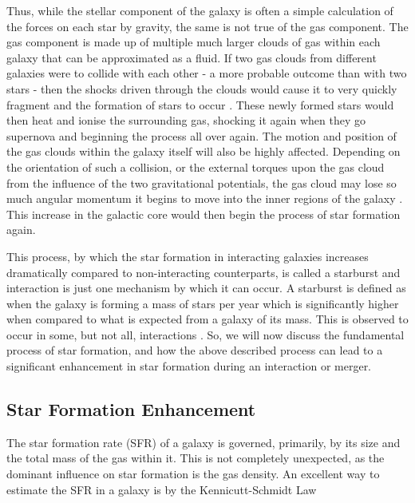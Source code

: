 Thus, while the stellar component of the galaxy is often a simple calculation of the forces on each star by gravity, the same is not true of the gas component. The gas component is made up of multiple much larger clouds of gas within each galaxy that can be approximated as a fluid. If two gas clouds from different galaxies were to collide with each other - a more probable outcome than with two stars - then the shocks driven through the clouds would cause it to very quickly fragment and the formation of stars to occur \citep{Papers on fragmentation of gas in interaction, paper on star formation in star fragments}. These newly formed stars would then heat and ionise the surrounding gas, shocking it again when they go supernova and beginning the process all over again. The motion and position of the gas clouds within the galaxy itself will also be highly affected. Depending on the orientation of such a collision, or the external torques upon the gas cloud from the influence of the two gravitational potentials, the gas cloud may lose so much angular momentum it begins to move into the inner regions of the galaxy \citep{Need a paper which talks about torques on gas in a system and the feedback involved here.}. This increase in the galactic core would then begin the process of star formation again. 

This process, by which the star formation in interacting galaxies increases dramatically compared to non-interacting counterparts, is called a starburst and interaction is just one mechanism by which it can occur. A starburst is defined as when the galaxy is forming a mass of stars per year which is significantly higher when compared to what is expected from a galaxy of its mass. This is observed to occur in some, but not all, interactions \citep{Review paper on starbursts in galaxies}. So, we will now discuss the fundamental process of star formation, and how the above described process can lead to a significant enhancement in star formation during an interaction or merger.


\subsection{Star Formation Enhancement} 
\noindent The star formation rate (SFR) of a galaxy is governed, primarily, by its size and the total mass of the gas within it. This is not completely unexpected, as the dominant influence on star formation is the gas density. An excellent way to estimate the SFR in a galaxy is by the Kennicutt-Schmidt Law \citep{Kennicutt-Schmidt Law Paper}


